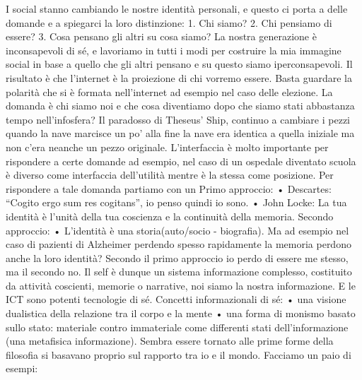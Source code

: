 \documentclass[11pt, a4page, twocolumn]{article}
\begin{document}
I social stanno cambiando le nostre identità personali, e questo ci porta a delle domande e a spiegarci la loro distinzione:
    1. Chi siamo?
    2. Chi pensiamo di essere?
    3. Cosa pensano gli altri su cosa siamo?
La nostra generazione è inconsapevoli di sé, e lavoriamo in tutti i modi per costruire la mia immagine social in base a quello che gli altri pensano e su questo siamo iperconsapevoli.
Il risultato è che l’internet è la proiezione di chi vorremo essere.  Basta guardare la polarità che si è formata nell’internet ad esempio nel caso delle elezione.
La domanda è chi siamo noi e che cosa diventiamo dopo che siamo stati abbastanza tempo nell’infosfera? Il paradosso di Theseus’ Ship, continuo a cambiare i pezzi quando la nave marcisce un po’ alla fine la nave era identica a quella iniziale ma non c’era neanche un pezzo originale.
L’interfaccia è molto importante per rispondere a certe domande ad esempio, nel caso di un ospedale diventato scuola è diverso come interfaccia dell’utilità mentre è la stessa come posizione.
Per rispondere a tale domanda partiamo con un Primo approccio:
    • Descartes: “Cogito ergo sum res cogitans”, io penso quindi io sono.
    • John Locke: La tua identità è l’unità della tua coscienza e la continuità della memoria.
Secondo approccio:
    • L'identità è una storia(auto/socio - biografia).
Ma ad esempio nel caso di pazienti di Alzheimer perdendo spesso rapidamente la memoria perdono anche la loro identità? Secondo il primo approccio io perdo di essere me stesso, ma il secondo no.
Il self è dunque un sistema informazione complesso, costituito da attività coscienti, memorie o narrative, noi siamo la nostra informazione. E le ICT sono potenti tecnologie di sé.
Concetti informazionali di sé:
    • una visione dualistica della relazione tra il corpo e la mente
    • una forma di monismo basato sullo stato: materiale contro immateriale come differenti stati dell’informazione (una metafisica informazione). 
      Sembra essere tornato alle prime forme della filosofia si basavano proprio sul rapporto tra io e il mondo.
Facciamo un paio di esempi:
\end{document}
